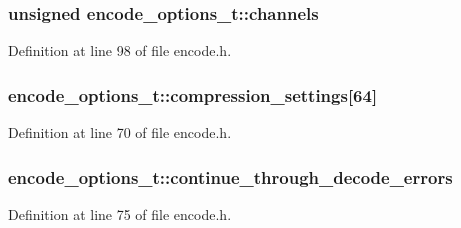 \subsubsection[{\texorpdfstring{channels}{channels}}]{\setlength{\rightskip}{0pt plus 5cm}unsigned encode\+\_\+options\+\_\+t\+::channels}\hypertarget{structencode__options__t_a9b78597b941bc883b454124423508d97}{}\label{structencode__options__t_a9b78597b941bc883b454124423508d97}


Definition at line 98 of file encode.\+h.

\subsubsection[{\texorpdfstring{compression\+\_\+settings}{compression_settings}}]{ encode\+\_\+options\+\_\+t\+::compression\+\_\+settings\mbox{[}64\mbox{]}}\hypertarget{structencode__options__t_a8cf89bc6b442bdc7cfcda48bffa0d9df}{}\label{structencode__options__t_a8cf89bc6b442bdc7cfcda48bffa0d9df}


Definition at line 70 of file encode.\+h.

\subsubsection[{\texorpdfstring{continue\+\_\+through\+\_\+decode\+\_\+errors}{continue_through_decode_errors}}]{ encode\+\_\+options\+\_\+t\+::continue\+\_\+through\+\_\+decode\+\_\+errors}\hypertarget{structencode__options__t_abe7efbf29786cbcbe3624b9618219eb1}{}\label{structencode__options__t_abe7efbf29786cbcbe3624b9618219eb1}


Definition at line 75 of file encode.\+h.


